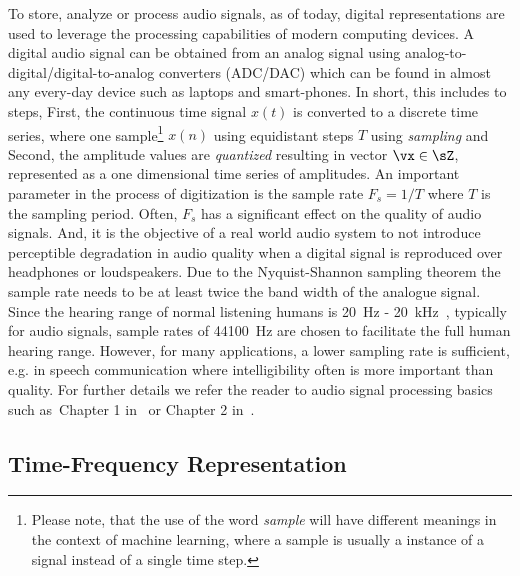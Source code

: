 To store, analyze or process audio signals, as of today, digital representations are used to leverage the processing capabilities of modern computing devices.
A digital audio signal can be obtained from an analog signal using analog-to-digital/digital-to-analog converters (ADC/DAC) which can be found in almost any every-day device such as laptops and smart-phones.
In short, this includes to steps, First, the continuous time signal \(x(t)\) is converted to a discrete time series, where one sample\footnote{Please note, that the use of the word \emph{sample} will have different meanings in the context of machine learning, where a sample is usually a instance of a signal instead of a single time step.} \(x(n)\) using equidistant steps \(T\) using \emph{sampling} and Second, the amplitude values are \emph{quantized} resulting in vector \(\vx \in \sZ\), represented as a one dimensional time series of amplitudes.
An important parameter in the process of digitization is the sample rate \(F_s = 1/T\) where \(T\) is the sampling period.
Often, \(F_s\) has a significant effect on the quality of audio signals.
And, it is the objective of a real world audio system to not introduce perceptible degradation in audio quality when a digital signal is reproduced over headphones or loudspeakers.
Due to the Nyquist-Shannon sampling theorem the sample rate needs to be at least twice the band width of the analogue signal.
Since the hearing range of normal listening humans is
20~\si{\hertz} - 20~\si{\kilo\hertz}~\cite{fastl90, moore89}, typically for audio signals, 
sample rates of 44100~\si{\hertz} are chosen to facilitate the full human hearing range.
However, for many applications, a lower sampling rate is sufficient, e.g. in speech communication where intelligibility often is more important than quality.
For further details we refer the reader to audio signal processing basics such as~Chapter 1 in~\cite{proakis96} or Chapter 2 in~\cite{Mueller15}.

\hypertarget{time-frequency-representation}{%
\subsection{Time-Frequency Representation}\label{time-frequency-representation}}

